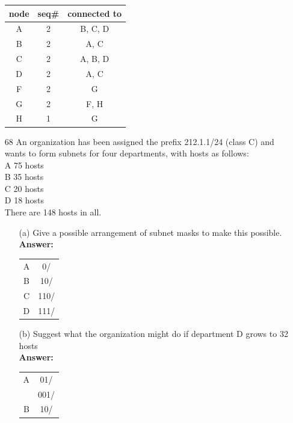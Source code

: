 \documentclass[a4paper]{article}
\newcommand\tab[1][0.5cm]{\hspace*{#1}}
\begin{document}
\begin{itemize}
	      \begin{tabular}{|c|c|c|}
	      	\hline
	      	node & seq\# & connected to \\
	      	\hline
	      	A    & 2     & B, C, D      \\
	      	\hline
	      	B    & 2     & A, C         \\
	      	\hline
	      	C    & 2     & A, B, D      \\
	      	\hline
	      	D    & 2     & A, C         \\
	      	\hline
	      	F    & 2     & G            \\
	      	\hline
	      	G    & 2     & F, H         \\
	      	\hline
	      	H    & 1     & G            \\
	      	\hline
	      \end{tabular}
	\item[68] An organization has been assigned the prefix 212.1.1/24 (class C) and wants to form subnets for four departments, with hosts as follows: \\
	      \tab\tab\tab A 75 hosts \\
	      \tab\tab\tab B 35 hosts \\
	      \tab\tab\tab C 20 hosts \\
	      \tab\tab\tab D 18 hosts \\
	      There are 148 hosts in all.
	      \begin{itemize}
	      	\item[(a)] Give a possible arrangement of subnet masks to make this possible. \\
	      	      \textbf{Answer:}
	      	      \begin{tabular}{c c}
	      	      	A & 0/   \\
	      	      	B & 10/  \\
	      	      	C & 110/ \\
	      	      	D & 111/ \\
	      	      \end{tabular}
	      	\item[(b)] Suggest what the organization might do if department D grows to 32 hosts \\
	      	      \textbf{Answer:} 
	      	      \begin{tabular}{c c}
	      	      	A & 01/  \\
	      	      	  & 001/ \\
	      	      	B & 10/  \\

\end{tabular}
\end{itemize}
\end{itemize}
\end{document}
